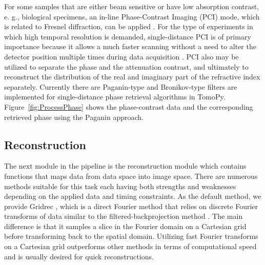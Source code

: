 \documentclass[pdf]{iucr}              %
\begin{document}
For some samples that are either beam sensitive or have low absorption contrast, e. g., biological specimens, an in-line Phase-Contrast Imaging (PCI) mode, which is related to Fresnel diffraction, can be applied \cite{Davis1999}. For the type of experiments in which high temporal resolution is demanded, single-distance PCI is of primary importance because it allows a much faster scanning without a need to alter the detector position multiple times during data acquisition \cite{Burvall:11}. PCI also may be utilized to separate the phase and the attenuation contrast, and ultimately to reconstruct the distribution of the real and imaginary part of the refractive index separately. Currently there are Paganin-type \cite{Paganin_2002} and Bronikov-type \cite{Bronnikov1999} filters are implemented for single-distance phase retrieval algorithms in TomoPy. Figure~\ref{fig:ProcessPhase} shows the phase-contrast data and the corresponding retrieved phase using the Paganin approach.


\subsection{Reconstruction}

The next module in the pipeline is the reconstruction module which contains functions that maps data from data space into image space. There are numerous methods suitable for this task each having both strengths and weaknesses depending on the applied data and timing constraints. As the default method, we provide Gridrec \cite{donath_spie_2006}, which is a direct Fourier method that relies on discrete Fourier transforms of data similar to the filtered-backprojection method \cite{kak_slaney}. The main difference is that it samples a slice in the Fourier domain on a Cartesian grid before transforming back to the spatial domain. Utilizing fast Fourier transforms on a Cartesian grid outperforms other methods in terms of computational speed and is usually desired for quick reconstructions.
\end{document}

